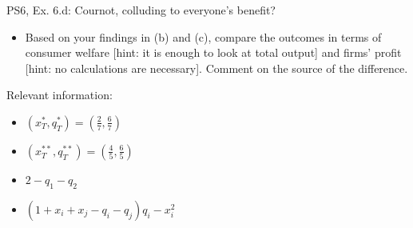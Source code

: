 \begin{frame}{PS6, Ex. 6.d: Cournot, colluding to everyone's benefit?}
    \begin{itemize}
    \item[(d)] Based on your findings in (b) and (c), compare the outcomes in terms of consumer welfare [hint: it is enough to look at total output] and firms’ profit [hint: no calculations are necessary]. Comment on the source of the difference.
    \end{itemize}
    \vspace{-10pt}
  \begin{multicols}{2}
    \vfill\null \columnbreak
    Relevant information:
    \begin{itemize}
      \item[(b)] $(x_T^{*},q_T^{*})= \left(\frac{2}{7},\frac{6}{7}\right)$
      \item[(c)] $(x_T^{**},q_T^{**})= \left(\frac{4}{5},\frac{6}{5}\right)$
      \item[$P$:] $2-q_1-q_2$
      \item[$\pi_i:$] $(1+x_i+x_j-q_i-q_j)q_i-x_i^2$
    \end{itemize}
    \vfill\null
  \end{multicols}
\end{frame}
